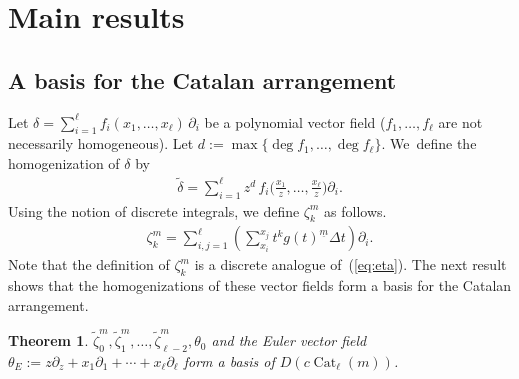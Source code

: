 \documentclass[pdftex]{sigma}
\numberwithin{equation}{section}
\newtheorem{Theorem}{Theorem}[section]
\newcommand{\Cat}{\operatorname{Cat}}
\newcommand{\sint}{\sum\nolimits}
\begin{document}
\section{Main results}\label{sec:main}

\subsection{A basis for the Catalan arrangement}

Let $\delta=\sum_{i=1}^\ell f_i(x_1, \dots, x_\ell)\,\partial_i$ be a polynomial
vector field ($f_1, \dots, f_\ell$ are not necessarily homogeneous).
Let $d:=\max\{\deg f_1, \dots, \deg f_\ell\}$. We~define the homogenization
of $\delta$ by
\begin{gather*}
\widetilde{\delta}=\sum_{i=1}^\ell z^d\, f_i\bigg(\frac{x_1}{z}, \dots, \frac{x_\ell}{z}\bigg)\partial_i.
\end{gather*}
Using the notion of discrete integrals, we define $\zeta_k^m$ as follows.
\begin{gather*}
\zeta_k^m=\sum_{i, j=1}^\ell\left(\sint_{x_i}^{x_j}t^kg(t)^{\underline{m}} \Delta t\right)
\partial_i.
\end{gather*}
Note that the definition of $\zeta_k^m$ is a discrete analogue of~(\ref{eq:eta}).
The next result shows that the homogenizations of these vector fields
form a basis for the Catalan arrangement.

\begin{Theorem}
\label{thm:cat}
$\widetilde{\zeta}_0^m, \widetilde{\zeta}_1^m, \dots, \widetilde{\zeta}_{\ell-2}^m,
\theta_0$ and
the Euler vector field $\theta_E:=z\partial_z+x_1\partial_1+\cdots+x_\ell\partial_\ell$
form a basis of $D(c\Cat_\ell(m))$.
\end{Theorem}
\end{document}
